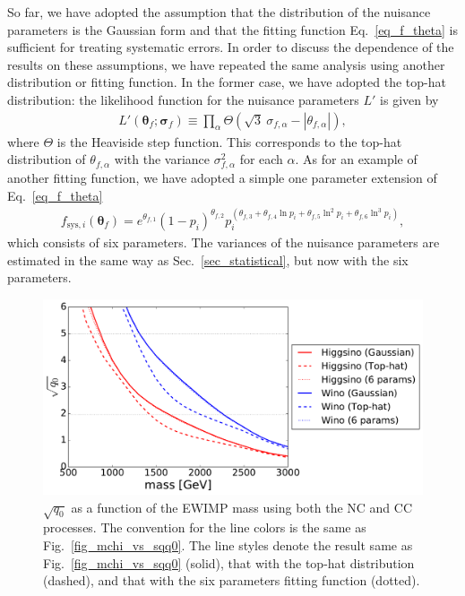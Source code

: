 \documentclass[12pt,twoside,book]{article}
\begin{document}
So far, we have adopted the assumption that the distribution of the
nuisance parameters is the Gaussian form and that the fitting function
Eq.~\eqref{eq_f_theta} is sufficient for treating systematic errors.
In order to discuss the dependence of the results on these
assumptions, we have repeated the same analysis using another
distribution or fitting function.  In the former case, we have adopted
the top-hat distribution: the likelihood function for the nuisance
parameters $L'$ is given by
\begin{align}
 L' (\bm{\theta}_f ; \bm{\sigma}_f) \equiv \prod_\alpha
 \Theta \left( \sqrt{3}\ \sigma_{f,\alpha}
 - \left| \theta_{f,\alpha} \right| \right),
\end{align}
where $\Theta$ is the Heaviside step function.  This corresponds to
the top-hat distribution of $\theta_{f,\alpha}$ with the variance
$\sigma_{f,\alpha}^2$ for each $\alpha$.  As for an example of another
fitting function, we have adopted a simple one parameter extension of
Eq.~\eqref{eq_f_theta}
\begin{align}
 f_{\mathrm{sys}, i} (\bm{\theta}_f) =
 e^{\theta_{f,1}} (1 - p_i)^{\theta_{f,2}}
 p_i^{(\theta_{f,3} + \theta_{f,4} \ln p_i + \theta_{f,5} \ln^2 p_i
 + \theta_{f,6} \ln^3 p_i)},\label{eq_6_param}
\end{align}
which consists of six parameters.
The variances of the nuisance parameters are estimated
in the same way as Sec.~\ref{sec_statistical}, but now with the six parameters.

\begin{figure}[t]
 \centering
 \includegraphics[width=0.7\linewidth]{mchi_vs_sqq0_comp.pdf}
 \caption{$\sqrt{q_0}$ as a function of the EWIMP mass using both the
 NC and CC processes.  The convention for the line colors is the same
 as Fig.~\ref{fig_mchi_vs_sqq0}.  The line styles denote the result
 same as Fig.~\ref{fig_mchi_vs_sqq0} (solid), that with the top-hat
 distribution (dashed), and that with the six parameters fitting
 function (dotted).}  \label{fig_mchi_vs_sqq0_comp}
\end{figure}
\end{document}
